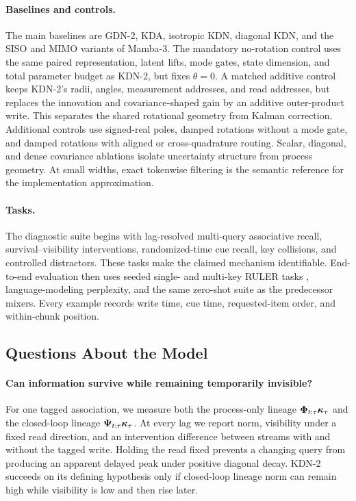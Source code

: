 \documentclass[11pt,letterpaper,logo]{yalearxiv}
\begin{document}
\paragraph{Baselines and controls.}
The main baselines are GDN-2, KDA, isotropic KDN, diagonal KDN, and the SISO and MIMO variants of
Mamba-3. The mandatory no-rotation control uses the same paired representation, latent lifts, mode
gates, state dimension, and total parameter budget as KDN-2, but fixes $\theta=0$. A matched
additive control keeps KDN-2's radii, angles, measurement addresses, and read addresses, but
replaces the innovation and covariance-shaped gain by an additive outer-product write. This
separates the shared rotational geometry from Kalman correction. Additional controls use
signed-real poles, damped rotations without a mode gate, and damped rotations with aligned or
cross-quadrature routing. Scalar, diagonal, and dense covariance ablations isolate uncertainty
structure from process geometry. At small widths, exact tokenwise filtering is the semantic
reference for the implementation approximation.

\paragraph{Tasks.}
The diagnostic suite begins with lag-resolved multi-query associative recall, survival--visibility
interventions, randomized-time cue recall, key collisions, and controlled distractors. These tasks
make the claimed mechanism identifiable. End-to-end evaluation then uses seeded single- and
multi-key RULER tasks \citep{hsieh2024ruler}, language-modeling perplexity, and the same zero-shot
suite as the predecessor mixers. Every example records write time, cue time, requested-item order,
and within-chunk position.

\subsection{Questions About the Model}
\label{sec:kdn2-model-evaluation}

\paragraph{Can information survive while remaining temporarily invisible?}
For one tagged association, we measure both the process-only lineage
$\boldsymbol{\Phi}_{t:\tau}\boldsymbol{\kappa}_\tau$ and the closed-loop lineage
$\boldsymbol{\Psi}_{t:\tau}\boldsymbol{\kappa}_\tau$. At every lag we report norm, visibility under a fixed read
direction, and an intervention difference between streams with and without the tagged write.
Holding the read fixed prevents a changing query from producing an apparent delayed peak under
positive diagonal decay. KDN-2 succeeds on its defining hypothesis only if closed-loop lineage norm
can remain high while visibility is low and then rise later.
\end{document}
